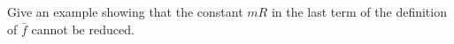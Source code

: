 \begin{exercise}[]{}
Give an example showing that the constant $mR$ in the last term of the definition of $\bar f$ cannot be reduced.
\end{exercise}

\begin{solution}[TODO]
\end{solution}
